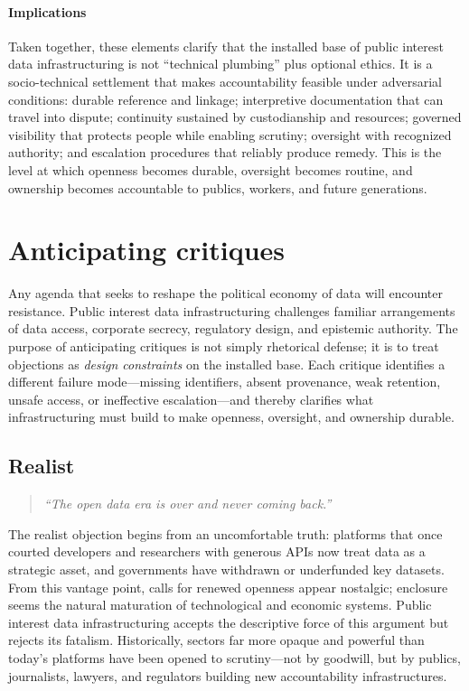 \documentclass[acmsmall,screen]{acmart}
\begin{document}
\paragraph*{Implications}
Taken together, these elements clarify that the installed base of public interest data infrastructuring is not ``technical plumbing'' plus optional ethics. It is a socio-technical settlement that makes accountability feasible under adversarial conditions: durable reference and linkage; interpretive documentation that can travel into dispute; continuity sustained by custodianship and resources; governed visibility that protects people while enabling scrutiny; oversight with recognized authority; and escalation procedures that reliably produce remedy. This is the level at which openness becomes durable, oversight becomes routine, and ownership becomes accountable to publics, workers, and future generations.

\section*{Anticipating critiques}

Any agenda that seeks to reshape the political economy of data will encounter resistance. Public interest data infrastructuring challenges familiar arrangements of data access, corporate secrecy, regulatory design, and epistemic authority. The purpose of anticipating critiques is not simply rhetorical defense; it is to treat objections as \emph{design constraints} on the installed base. Each critique identifies a different failure mode---missing identifiers, absent provenance, weak retention, unsafe access, or ineffective escalation---and thereby clarifies what infrastructuring must build to make openness, oversight, and ownership durable.

\subsection*{Realist}
\begin{quote}\centering
\textit{``The open data era is over and never coming back.''}
\end{quote}

\noindent The realist objection begins from an uncomfortable truth: platforms that once courted developers and researchers with generous APIs now treat data as a strategic asset, and governments have withdrawn or underfunded key datasets. From this vantage point, calls for renewed openness appear nostalgic; enclosure seems the natural maturation of technological and economic systems. Public interest data infrastructuring accepts the descriptive force of this argument but rejects its fatalism. Historically, sectors far more opaque and powerful than today's platforms have been opened to scrutiny---not by goodwill, but by publics, journalists, lawyers, and regulators building new accountability infrastructures.
\end{document}
